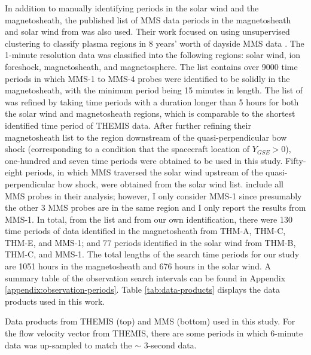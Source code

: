 In addition to manually identifying periods in the solar wind and the magnetosheath, the published list of MMS data periods in the magnetosheath and solar wind from \cite{ToyEdens:2024} was also used. Their work focused on using unsupervised clustering to classify plasma regions in 8 years' worth of dayside MMS data \citep{ToyEdens2:2024}. The 1-minute resolution data was classified into the following regions: solar wind, ion foreshock, magnetosheath, and magnetosphere. The \cite{ToyEdens:2024} list contains over 9000 time periods in which MMS-1 to MMS-4 probes were identified to be solidly in the magnetosheath, with the minimum period being 15 minutes in length. The list of \cite{ToyEdens:2024} was refined by taking time periods with a duration longer than 5 hours for both the solar wind and magnetosheath regions, which is comparable to the shortest identified time period of THEMIS data. After further refining their magnetosheath list to the region downstream of the quasi-perpendicular bow shock (corresponding to a condition that the spacecraft location of $Y_{GSE}>0$), one-hundred and seven time periods were obtained to be used in this study. Fifty-eight periods, in which MMS traversed the solar wind upstream of the quasi-perpendicular bow shock, were obtained from the \cite{ToyEdens:2024} solar wind list. \cite{ToyEdens2:2024} include all MMS probes in their analysis; however, I only consider MMS-1 since presumably the other 3 MMS probes are in the same region and I only report the results from MMS-1. In total, from the \cite{ToyEdens:2024} list and from our own identification, there were 130 time periods of data identified in the magnetosheath from THM-A, THM-C, THM-E, and MMS-1; and 77 periods identified in the solar wind from THM-B, THM-C, and MMS-1. The total lengths of the search time periods for our study are 1051 hours in the magnetosheath and 676 hours in the solar wind. A summary table of the observation search intervals can be found in Appendix \ref{appendix:observation-periods}. Table \ref{tab:data-products} displays the data products used in this work.

\begin{table}
    \centering
    
    \caption{Data products from THEMIS (top) and MMS (bottom) used in this study. For the flow velocity vector from THEMIS, there are some periods in which 6-minute data was up-sampled to match the $\sim$ 3-second data.}
    \label{tab:data-products}
\end{table}

